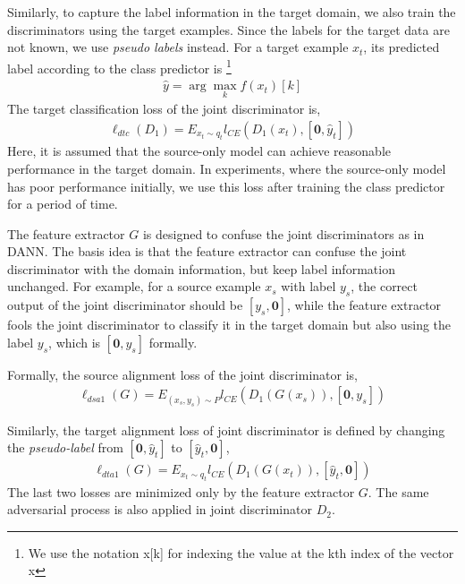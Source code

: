 \documentclass{ecai}
\begin{document}
Similarly, to capture the label information in the target domain, we also train the discriminators using the target examples. Since the labels for the target data are not known, we use {\emph{pseudo labels}} instead. For a target example $x_{t}$, its predicted label according to the class predictor is \footnote {We use the notation x[k] for indexing the value at the kth index of the vector x}
\begin{align}
\hat y = \arg \max_{k} f(x_t)[k]
\end{align}
The  target classification loss of the joint discriminator is,
\begin{align}
\ell_{dtc}(D_1) = E_{x_t \sim q_t} l_{CE}({D_1}(x_t), [\boldsymbol{0}, \hat y_t])
\end{align}
Here, it is assumed that the source-only model can achieve reasonable performance in the target domain. In experiments, where the source-only model has poor performance initially, we use this loss after training the class predictor for a period of time.

The feature extractor $G$ is designed to confuse the joint discriminators as in DANN\cite{b18}. The basis idea is that the feature extractor can confuse the joint discriminator with the domain information, but keep label information unchanged. For example, for a source example $x_s$ with label $y_s$, the correct output of the joint discriminator should be $[y_s, \boldsymbol{0}]$, while the feature extractor fools the joint discriminator to classify it in the target domain but also using the label $y_s$, which is $[\boldsymbol{0}, y_s]$ formally.

Formally, the source alignment loss  of the joint discriminator is,
\begin{align}
\ell_{dsa1}(G) = E_{(x_s,y_s) \sim P}l_{CE}({D_1}(G(x_s)), [\boldsymbol{0},y_s])
\end{align}

Similarly, the target alignment loss of joint discriminator is defined by changing the {\emph{pseudo-label}} from $[\boldsymbol{0}, \hat y_t]$ to $[\hat y_t, \boldsymbol{0}]$,
\begin{align}
\ell_{dta1}(G) = E_{x_t \sim q_t} l_{CE}({D_1}(G(x_t)), [\hat y_t, \boldsymbol{0}])
\end{align}
The last two losses are minimized only by the feature extractor $G$. The same adversarial process is also applied in joint discriminator $D_2$.

\setlength{\abovecaptionskip}{-0.1cm}  
\end{document}
